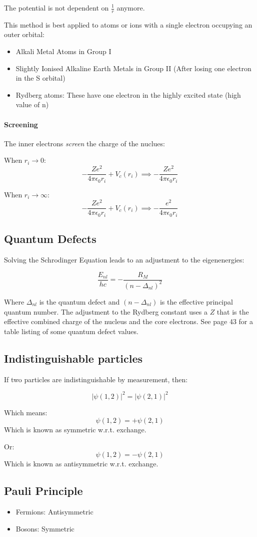 \documentclass[12pt]{article}
\begin{document}
The potential is not dependent on $\frac{1}{r}$ anymore.

This method is best applied to atoms or ions with a single electron occupying an outer orbital:
\begin{itemize}
    \item Alkali Metal Atoms in Group I
    \item Slightly Ionised Alkaline Earth Metals in Group II (After losing one electron in the S orbital)
    \item Rydberg atoms: These have one electron in the highly excited state (high value of n)
\end{itemize}

\paragraph{Screening}
The inner electrons \textit{screen} the charge of the nuclues:

When $r_i \to 0$:
\[ -\frac{Ze^2}{4\pi\epsilon_0 r_i} + V_c(r_i) \implies -\frac{Ze^2}{4\pi\epsilon_0 r_i}\]

When $r_i \to \infty$:
\[ -\frac{Ze^2}{4\pi\epsilon_0 r_i} + V_c(r_i) \implies -\frac{e^2}{4\pi\epsilon_0 r_i}\]

\subsection{Quantum Defects}

Solving the Schrodinger Equation leads to an adjustment to the eigenenergies:

\[\frac{E_{nl}}{hc} = -\frac{R_M}{(n-\Delta_{nl})^2}\]

Where $\Delta_{nl}$ is the quantum defect and $(n-\Delta_{nl})$ is the effective principal quantum number. The adjustment to the Rydberg constant uses a $Z$ that is the effective combined charge of the nucleus and the core electrons. See page 43 for a table listing of some quantum defect values.

\subsection{Indistinguishable particles}

If two particles are indistinguishable by measurement, then:

\[ |\psi(1,2)|^2 = |\psi(2,1)|^2\]

Which means:
\[ \psi(1,2) = +\psi(2,1)\]
Which is known as symmetric w.r.t. exchange.

Or:
\[ \psi(1,2) = -\psi(2,1)\]
Which is known as antisymmetric w.r.t. exchange.

\subsection{Pauli Principle}

\begin{itemize}
    \item Fermions: Antisymmetric
    \item Bosons: Symmetric
\end{itemize}
\end{document}

